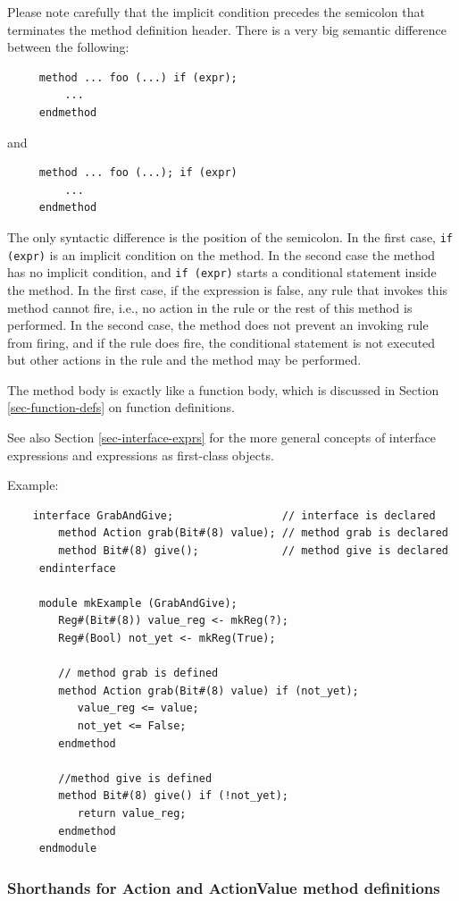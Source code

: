 \documentclass[twoside,letterpaper]{article}
\begin{document}
Please note carefully that the implicit condition precedes the
semicolon that terminates the method definition header.  There is a
very big semantic difference between the following:
\begin{verbatim}
     method ... foo (...) if (expr);
         ...
     endmethod
\end{verbatim}
and
\begin{verbatim}
     method ... foo (...); if (expr)
         ...
     endmethod
\end{verbatim}
The only syntactic difference is the position of the semicolon.  In
the first case, \texttt{if (expr)} is an implicit condition on the
method.  In the second case the method has no implicit condition, and
\texttt{if (expr)} starts a conditional statement inside the method.  In
the first case, if the expression is false, any rule that invokes this
method cannot fire, i.e., no action in the rule or the rest of this
method is performed.  In the second case, the method does not prevent
an invoking rule from firing, and if the rule does fire, the
conditional statement is not executed but other actions in the rule
and the method may be performed.

The method body is exactly like a function body, which is discussed in
Section \ref{sec-function-defs} on function definitions.

See also Section \ref{sec-interface-exprs} for the more general
concepts of interface expressions and expressions as first-class
objects.

Example:
\begin{verbatim}
    interface GrabAndGive;                 // interface is declared
        method Action grab(Bit#(8) value); // method grab is declared
        method Bit#(8) give();             // method give is declared  
     endinterface

     module mkExample (GrabAndGive);
        Reg#(Bit#(8)) value_reg <- mkReg(?);
        Reg#(Bool) not_yet <- mkReg(True);

        // method grab is defined
        method Action grab(Bit#(8) value) if (not_yet);
           value_reg <= value;
           not_yet <= False;
        endmethod

        //method give is defined
        method Bit#(8) give() if (!not_yet);
           return value_reg;
        endmethod
     endmodule
\end{verbatim}


\subsubsection{Shorthands for Action and ActionValue method definitions}
\end{document}
